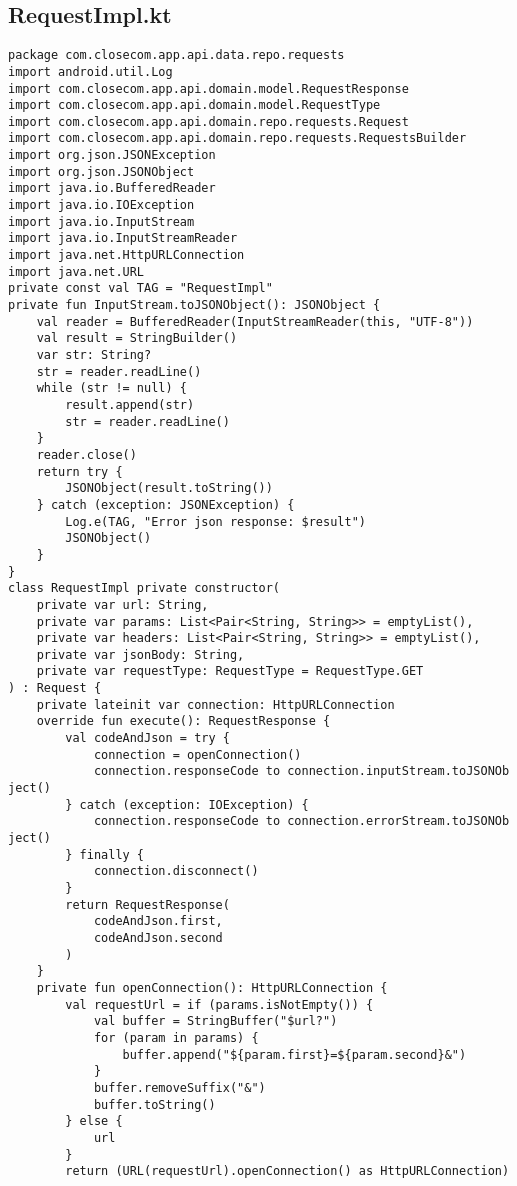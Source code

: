 \documentclass[listing]{espd}
\begin{document}
\subsection{RequestImpl.kt}
\begin{verbatim}
package com.closecom.app.api.data.repo.requests
import android.util.Log
import com.closecom.app.api.domain.model.RequestResponse
import com.closecom.app.api.domain.model.RequestType
import com.closecom.app.api.domain.repo.requests.Request
import com.closecom.app.api.domain.repo.requests.RequestsBuilder
import org.json.JSONException
import org.json.JSONObject
import java.io.BufferedReader
import java.io.IOException
import java.io.InputStream
import java.io.InputStreamReader
import java.net.HttpURLConnection
import java.net.URL
private const val TAG = "RequestImpl"
private fun InputStream.toJSONObject(): JSONObject {
    val reader = BufferedReader(InputStreamReader(this, "UTF-8"))
    val result = StringBuilder()
    var str: String?
    str = reader.readLine()
    while (str != null) {
        result.append(str)
        str = reader.readLine()
    }
    reader.close()
    return try {
        JSONObject(result.toString())
    } catch (exception: JSONException) {
        Log.e(TAG, "Error json response: $result")
        JSONObject()
    }
}
class RequestImpl private constructor(
    private var url: String,
    private var params: List<Pair<String, String>> = emptyList(),
    private var headers: List<Pair<String, String>> = emptyList(),
    private var jsonBody: String,
    private var requestType: RequestType = RequestType.GET
) : Request {
    private lateinit var connection: HttpURLConnection
    override fun execute(): RequestResponse {
        val codeAndJson = try {
            connection = openConnection()
            connection.responseCode to connection.inputStream.toJSONOb
ject()
        } catch (exception: IOException) {
            connection.responseCode to connection.errorStream.toJSONOb
ject()
        } finally {
            connection.disconnect()
        }
        return RequestResponse(
            codeAndJson.first,
            codeAndJson.second
        )
    }
    private fun openConnection(): HttpURLConnection {
        val requestUrl = if (params.isNotEmpty()) {
            val buffer = StringBuffer("$url?")
            for (param in params) {
                buffer.append("${param.first}=${param.second}&")
            }
            buffer.removeSuffix("&")
            buffer.toString()
        } else {
            url
        }
        return (URL(requestUrl).openConnection() as HttpURLConnection)

\end{verbatim}
\end{document}
